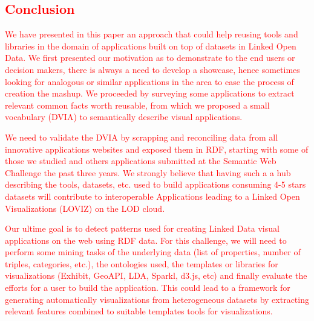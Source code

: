 \textcolor{red}{
\subsection{Conclusion} \label{sec:conclusion}
We have presented in this paper an approach that could help reusing tools and libraries in the domain of applications built on top of datasets in Linked Open Data. We first presented our motivation as to demonstrate to the end users or decision makers, there is always a need to develop a showcase, hence sometimes looking for analogous or similar applications in the area to ease the process of creation the mashup. We proceeded by surveying some applications to extract relevant common facts worth reusable, from which we proposed a small vocabulary (DVIA)  to semantically describe visual applications. 

We need to validate the DVIA by scrapping and reconciling data from all innovative applications websites and exposed them in RDF, starting with some of those we studied and others applications submitted at the Semantic Web Challenge the past three years. We strongly believe that having such a a hub  describing the tools, datasets, etc.  used to build  applications consuming 4-5 stars datasets will contribute to interoperable Applications leading to a Linked Open Visualizations (LOVIZ) on the LOD cloud.

Our ultime goal is to detect patterns used for creating Linked Data visual applications on the web using RDF data. For this challenge, we will need to perform some mining tasks of the underlying data (list of properties, number of triples, categories, etc.), the ontologies used, the templates or libraries for visualizations (Exhibit, GeoAPI, LDA, Sparkl, d3.js, etc) and finally evaluate the efforts for a user to build the application. This could lead to a framework for generating automatically visualizations from heterogeneous datasets by extracting relevant features combined to suitable templates tools for visualizations.}
